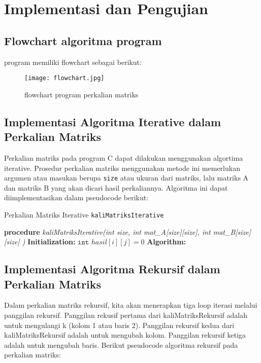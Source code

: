 \documentclass[conference]{IEEEtran}
\begin{document}
\begin{center}
\end{center}

\section{Implementasi dan Pengujian}

\subsection{Flowchart algoritma program}
program memiliki flowchart sebagai berikut:

\begin{figure}[htbp]
    \texttt{[image: flowchart.jpg]}
    \centering
    \caption{flowchart program perkalian matriks}        
\end{figure}

\subsection{Implementasi Algoritma Iterative dalam Perkalian Matriks}
Perkalian matriks pada program C dapat dilakukan menggunakan algortima iterative.
Prosedur perkalian matriks menggunakan metode ini memerlukan argumen atau masukan 
berupa \texttt{size} atau ukuran dari matriks, lalu matriks A dan matriks B yang akan
dicari hasil perkaliannya. Algoritma ini dapat diimplementasikan dalam pseudocode berikut:

\begin{algorithm}
    \caption{Perkalian Matriks Iterative \texttt{kaliMatriksIterative} }\label{alg:one}
    \DontPrintSemicolon
    \textbf{procedure} \emph{kaliMatriksIterative(int size, int mat\_A[size][size], int mat\_B[size][size] )}\;
    \textbf{Initialization:}\;
    $\texttt{int } hasil[i][j] = 0$\;
    \textbf{Algorithm:}\;
\end{algorithm}

\subsection{Implementasi Algoritma Rekursif dalam Perkalian Matriks}
Dalam perkalian matriks rekursif, kita akan menerapkan tiga loop iterasi melalui panggilan
rekursif. Panggilan rekusif pertama dari kaliMatriksRekursif adalah untuk mengulangi k (kolom 1
atau baris 2). Panggilan rekursif kedua dari kaliMatriksRekursif adalah untuk mengubah kolom.
Panggilan rekursif ketiga adalah untuk mengubah baris. Berikut pseudocode algoritma rekursif
pada perkalian matriks:
\end{document}
